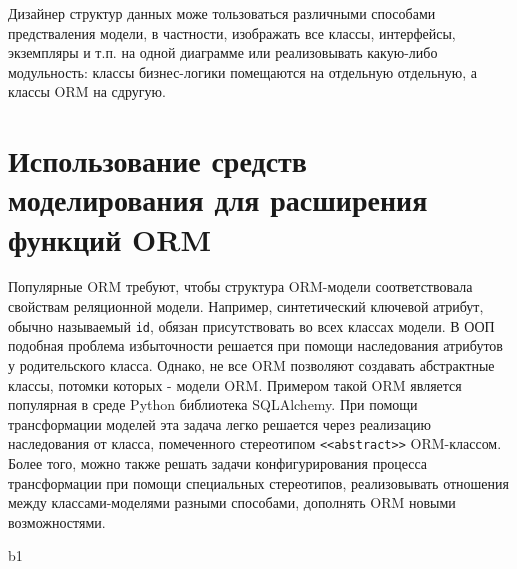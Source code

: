 \documentclass[12pt]{article}
\begin{document}
Дизайнер структур данных може тользоваться различными способами предстваления модели, в частности, изображать все классы, интерфейсы, экземпляры и т.п. на одной диаграмме или реализовывать какую-либо модульность: классы бизнес-логики помещаются на отдельную отдельную, а классы ORM на сдругую.

\section{Использование средств моделирования для расширения функций ORM}

Популярные ORM требуют, чтобы структура ORM-модели соответствовала свойствам реляционной модели.  Например, синтетический ключевой атрибут, обычно называемый \texttt{id}, обязан присутствовать во всех классах модели.  В ООП подобная проблема избыточности решается при помощи наследования атрибутов у родительского класса. Однако, не все ORM позволяют создавать абстрактные классы, потомки которых - модели ORM.  Примером такой ORM является популярная в среде Python библиотека SQLAlchemy.  При помощи трансформации моделей эта задача легко решается через реализацию наследования от класса, помеченного стереотипом \texttt{<<abstract>>} ORM-классом.  Более того, можно также решать задачи конфигурирования процесса трансформации при помощи специальных стереотипов, реализовывать отношения между классами-моделями разными способами, дополнять ORM новыми возможностями.

\renewcommand\bibname{Литература}
\begin{thebibliography}{99}
 b1
\end{thebibliography}
\end{document}
